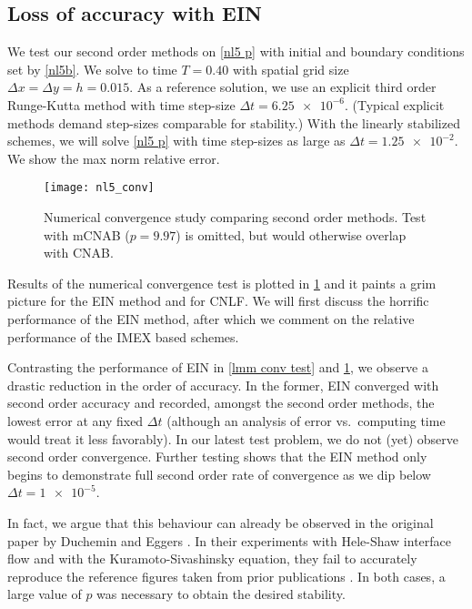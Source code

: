 \subsection{Loss of accuracy with EIN}
We test our second order methods on \cref{nl5 p} with initial and boundary conditions set by \cref{nl5b}. We solve to time $T=0.40$ with spatial grid size $\Delta x = \Delta y = h =0.015$. As a reference solution, we use an explicit third order Runge-Kutta method with time step-size $\Delta t=\num{6.25e-6}$. (Typical explicit methods demand step-sizes comparable for stability.) With the linearly stabilized schemes, we will solve \cref{nl5 p} with time step-sizes as large as $\Delta t = \num{1.25e-2}$. We show the max norm relative error.

\begin{figure}[htb!]
        \centering
\texttt{[image: nl5\_conv]}
\caption[Numerical convergence study comparing second order methods.]{Numerical convergence study comparing second order methods. Test with mCNAB ($p=9.97$) is omitted, but would otherwise overlap with CNAB.}
\label{fig:nl5 conv}
\end{figure}

Results of the numerical convergence test is plotted in \cref{fig:nl5 conv} and it paints a grim picture for the EIN method and for CNLF. We will first discuss the horrific performance of the EIN method, after which we comment on the relative performance of the IMEX based schemes. 

Contrasting the performance of EIN in \cref{lmm conv test} and \cref{fig:nl5 conv}, we observe a drastic reduction in the order of accuracy. In the former, EIN converged with second order accuracy and recorded, amongst the second order methods, the lowest error at any fixed $\Delta t$ (although an analysis of error vs.\ computing time would treat it less favorably). In our latest test problem, we do not (yet) observe second order convergence. Further testing shows that the EIN method only begins to demonstrate full second order rate of convergence as we dip below $\Delta t=\num{1e-5}$.

In fact, we argue that this behaviour can already be observed in the original paper by Duchemin and Eggers \cite{duchemin2014explicit}. In their experiments with Hele-Shaw interface flow and with the Kuramoto-Sivashinsky equation, they fail to accurately reproduce the reference figures taken from prior publications \cite{hou1994removing,kassam2005fourth}. In both cases, a large value of $p$ was necessary to obtain the desired stability. 

